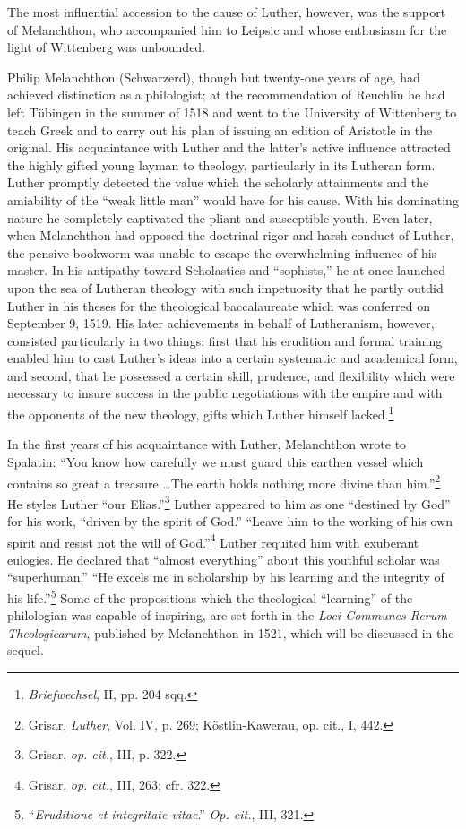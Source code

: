 The most influential accession to the cause of Luther, however, was
the support of Melanchthon, who accompanied him to Leipsic and
whose enthusiasm for the light of Wittenberg was unbounded.

Philip Melanchthon (Schwarzerd), though but twenty-one years
of age, had achieved distinction as a philologist; at the recommendation
of Reuchlin he had left Tübingen in the summer of 1518 and
went to the University of Wittenberg to teach Greek and to carry
out his plan of issuing an edition of Aristotle in the original. His
acquaintance with Luther and the latter’s active influence attracted
the highly gifted young layman to theology, particularly in its
Lutheran form. Luther promptly detected the value which the
scholarly attainments and the amiability of the “weak little man”
would have for his cause. With his dominating nature he completely
captivated the pliant and susceptible youth. Even later, when Melanchthon
had opposed the doctrinal rigor and harsh conduct of
Luther, the pensive bookworm was unable to escape the overwhelming
influence of his master. In his antipathy toward Scholastics and
“sophists,” he at once launched upon the sea of Lutheran theology
with such impetuosity that he partly outdid Luther in his theses for
the theological baccalaureate which was conferred on September
9, 1519. His later achievements in behalf of Lutheranism, however,
consisted particularly in two things: first that his erudition and
formal training enabled him to cast Luther's ideas into a certain
systematic and academical form, and second, that he possessed a
certain skill, prudence, and flexibility which were necessary to insure
success in the public negotiations with the empire and with the
opponents of the new theology, gifts which Luther himself lacked.\footnote
{\textit{Briefwechsel}, II, pp. 204 sqq.}

In the first years of his acquaintance with Luther, Melanchthon
wrote to Spalatin: ``You know how carefully we must guard this
earthen vessel which contains so great a treasure \dots The earth
holds nothing more divine than him.''\footnote{Grisar, \textit{Luther}, Vol. IV, p. 269; Köstlin-Kawerau, op. cit., I, 442.}
He styles Luther “our Elias.”\footnote{Grisar, \textit{op. cit.}, III, p. 322.}
Luther appeared to him as one “destined by God” for his
work, “driven by the spirit of God.” “Leave him to the working
of his own spirit and resist not the will of God.”\footnote{Grisar, \textit{op. cit.}, III, 263; cfr. 322.}
Luther requited
him with exuberant eulogies. He declared that “almost everything”
about this youthful scholar was “superhuman.” “He excels me in
scholarship by his learning and the integrity of his life.”\footnote
{“\textit{Eruditione et integritate vitae}.” \textit{Op. cit.}, III, 321.}
Some
of the propositions which the theological “learning” of the philologian
was capable of inspiring, are set forth in the \textit{Loci Communes Rerum
Theologicarum}, published by Melanchthon in 1521, which will be
discussed in the sequel.

